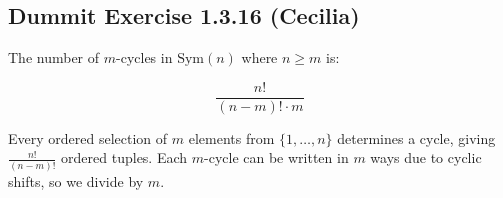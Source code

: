 \subsection*{Dummit Exercise 1.3.16 (Cecilia)}

The number of $m$-cycles in $\text{Sym}(n)$ where $n \ge m$ is:

\[
  \frac{n!}{(n - m)! \cdot m}
\]

Every ordered selection of $m$ elements from $\{1, \ldots, n\}$ determines a cycle, giving $\frac{n!}{(n-m)!}$ ordered tuples. Each $m$-cycle can be written in $m$ ways due to cyclic shifts, so we divide by $m$.
